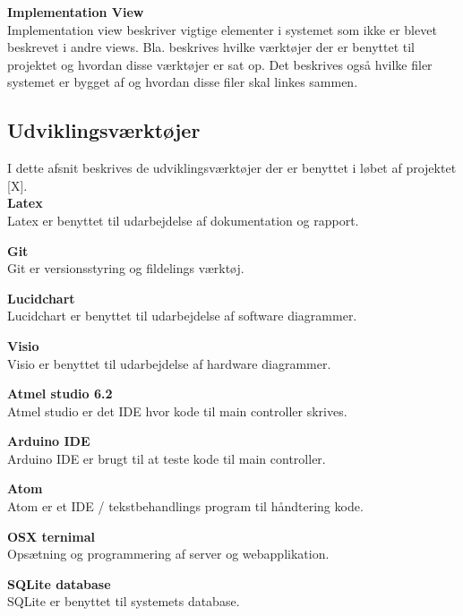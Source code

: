 \textbf{Implementation View}\\
Implementation view beskriver vigtige elementer i systemet som ikke er blevet beskrevet i andre views. Bla. beskrives hvilke værktøjer der er benyttet til projektet og hvordan disse værktøjer er sat op. Det beskrives også hvilke filer systemet er bygget af og hvordan disse filer skal linkes sammen.


\newpage
\subsection{Udviklingsværktøjer}
I dette afsnit beskrives de udviklingsværktøjer der er benyttet i løbet af projektet [X]. \\

\textbf{Latex}\\
Latex er benyttet til udarbejdelse af dokumentation og rapport. 

\textbf{Git}\\
Git er versionsstyring og fildelings værktøj.

\textbf{Lucidchart}\\
Lucidchart er benyttet til udarbejdelse af software diagrammer.

\textbf{Visio}\\
Visio er benyttet til udarbejdelse af hardware diagrammer.

\textbf{Atmel studio 6.2}\\
Atmel studio er det IDE hvor kode til main controller skrives.

\textbf{Arduino IDE}\\
Arduino IDE er brugt til at teste kode til main controller.

\textbf{Atom}\\
Atom er et IDE / tekstbehandlings program til håndtering kode.

\textbf{OSX ternimal}\\
Opsætning og programmering af server og webapplikation. 

\textbf{SQLite database}\\
SQLite er benyttet til systemets database.